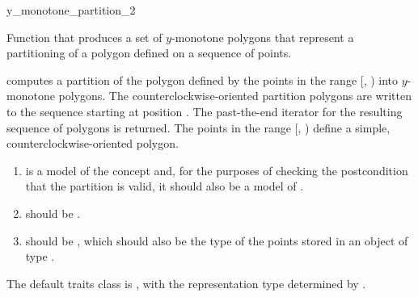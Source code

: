\begin{ccRefFunction}{y_monotone_partition_2}

\ccDefinition

Function that produces a set of $y$-monotone polygons that 
represent a partitioning of a polygon defined on a sequence of points.


{
computes a partition of the polygon defined 
by the points in the range [, ) into $y$-monotone 
polygons. The counterclockwise-oriented partition polygons are written to
the sequence starting at position .  The past-the-end iterator for 
the resulting sequence of polygons is returned.
\ccPrecond The points in the range [, ) define a
simple, counterclockwise-oriented polygon.
}

\begin{enumerate}
    \item {} is a model of the concept
          and, for the purposes
          of checking the postcondition that the partition is valid, it should 
          also be a model of .
    \item {} should be 
          .
    \item {} should be ,
          which should also be the type of the points stored in an object
          of type .
\end{enumerate}

The default traits class  is ,
with the representation type determined by .

\ccSeeAlso
{} \\
 \\
 \\
 \\


\end{ccRefFunction}
